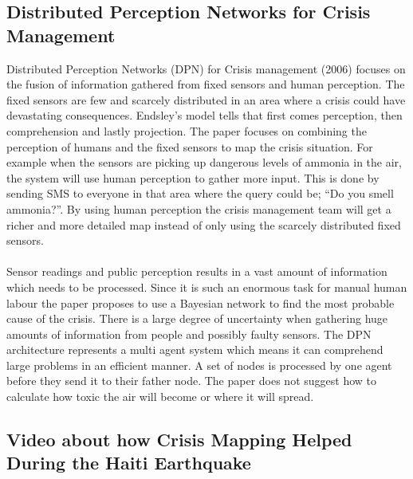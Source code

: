 \subsection{Distributed Perception Networks for Crisis Management}

Distributed Perception Networks (DPN) for Crisis management (2006)\cite{dpn} focuses on the fusion of information gathered from fixed sensors and human perception. The fixed sensors are few and scarcely distributed in an area where a crisis could have devastating consequences. Endsley’s model tells that first comes perception, then comprehension and lastly projection. The paper focuses on combining the perception of humans and the fixed sensors to map the crisis situation. For example when the sensors are picking up dangerous levels of ammonia in the air, the system will use human perception to gather more input. This is done by sending SMS to everyone in that area where the query could be; “Do you smell ammonia?”. By using human perception the crisis management team will get a richer and more detailed map instead of only using the scarcely distributed fixed sensors.
\\\\
Sensor readings and public perception results in a vast amount of information which needs to be processed. Since it is such an enormous task for manual human labour the paper proposes to use a Bayesian network to find the most probable cause of the crisis. There is a large degree of uncertainty when gathering huge amounts of information from people and possibly faulty sensors. The DPN architecture represents a multi agent system which means it can comprehend large problems in an efficient manner. A set of nodes is processed by one agent before they send it to their father node. The paper does not suggest how to calculate how toxic the air will become or where it will spread.  

\subsection{Video about how Crisis Mapping Helped During the Haiti Earthquake}

